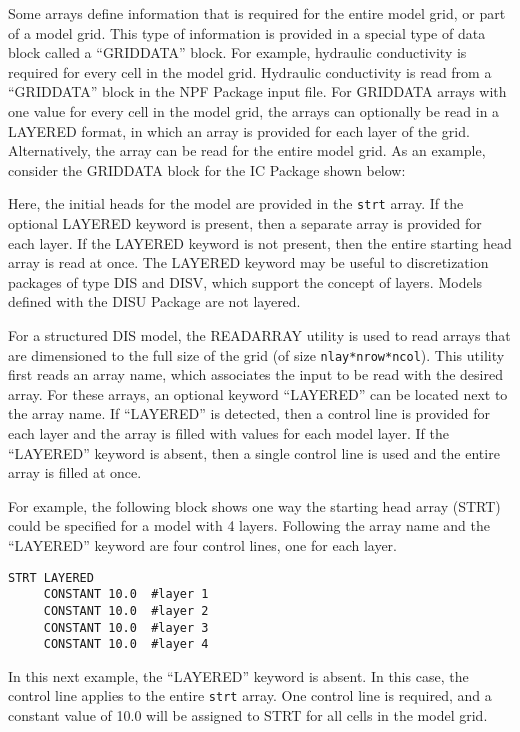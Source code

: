 Some arrays define information that is required for the entire model grid, or part of a model grid.  This type of information is provided in a special type of data block called a ``GRIDDATA'' block.  For example, hydraulic conductivity is required for every cell in the model grid.  Hydraulic conductivity is read from a ``GRIDDATA'' block in the NPF Package input file.  For GRIDDATA arrays with one value for every cell in the model grid, the arrays can optionally be read in a LAYERED format, in which an array is provided for each layer of the grid.  Alternatively, the array can be read for the entire model grid.  As an example, consider the GRIDDATA block for the IC Package shown below:



Here, the initial heads for the model are provided in the \texttt{strt} array.  If the optional LAYERED keyword is present, then a separate array is provided for each layer.  If the LAYERED keyword is not present, then the entire starting head array is read at once.  The LAYERED keyword may be useful to discretization packages of type DIS and DISV, which support the concept of layers.  Models defined with the DISU Package are not layered.

For a structured DIS model, the READARRAY utility is used to read arrays that are dimensioned to the full size of the grid (of size \texttt{nlay*nrow*ncol}). This utility first reads an array name, which associates the input to be read with the desired array.  For these arrays, an optional keyword ``LAYERED'' can be located next to the array name.  If ``LAYERED'' is detected, then a control line is provided for each layer and the array is filled with values for each model layer.  If the ``LAYERED'' keyword is absent, then a single control line is used and the entire array is filled at once.

For example, the following block shows one way the starting head array (STRT) could be specified for a model with 4 layers.  Following the array name and the ``LAYERED'' keyword are four control lines, one for each layer.

\begin{lstlisting}[style=inputfile]
  STRT LAYERED
     CONSTANT 10.0  #layer 1
     CONSTANT 10.0  #layer 2
     CONSTANT 10.0  #layer 3
     CONSTANT 10.0  #layer 4
\end{lstlisting}

In this next example, the ``LAYERED'' keyword is absent.  In this case, the control line applies to the entire \texttt{strt} array.  One control line is required, and a constant value of 10.0 will be assigned to STRT for all cells in the model grid.

